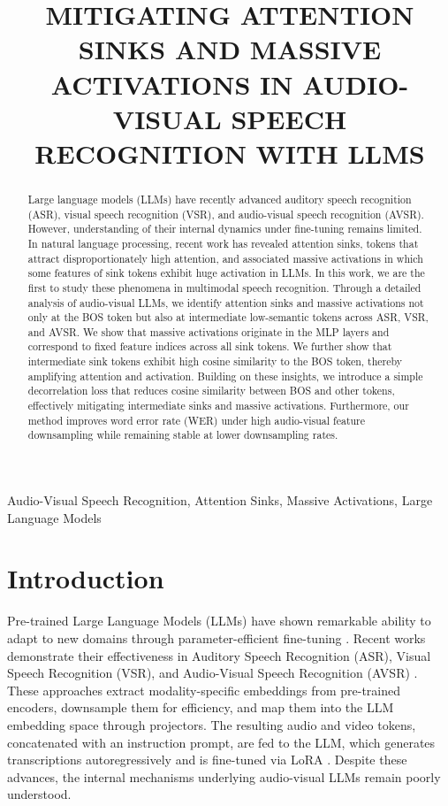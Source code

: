 \documentclass{article}
\title{MITIGATING ATTENTION SINKS AND MASSIVE ACTIVATIONS IN AUDIO-VISUAL SPEECH RECOGNITION WITH LLMS}
\begin{document}
\ninept
%
\maketitle
%
\begin{abstract}
Large language models (LLMs) have recently advanced auditory speech recognition (ASR), visual speech recognition (VSR), and audio-visual speech recognition (AVSR). However, understanding of their internal dynamics under fine-tuning remains limited. In natural language processing, recent work has revealed attention sinks, tokens that attract disproportionately high attention, and associated massive activations in which some features of sink tokens exhibit huge activation in LLMs. In this work, we are the first to study these phenomena in multimodal speech recognition. Through a detailed analysis of audio-visual LLMs, we identify attention sinks and massive activations not only at the BOS token but also at intermediate low-semantic tokens across ASR, VSR, and AVSR. We show that massive activations originate in the MLP layers and correspond to fixed feature indices across all sink tokens. We further show that intermediate sink tokens exhibit high cosine similarity to the BOS token, thereby amplifying attention and activation. Building on these insights, we introduce a simple decorrelation loss that reduces cosine similarity between BOS and other tokens, effectively mitigating intermediate sinks and massive activations. Furthermore, our method improves word error rate (WER) under high audio-visual feature downsampling while remaining stable at lower downsampling rates.
\end{abstract}
%
\begin{keywords} 
Audio-Visual Speech Recognition, Attention Sinks, Massive Activations, Large Language Models
\end{keywords}
%
\section{Introduction}
\label{sec:intro}
Pre-trained Large Language Models (LLMs) have shown remarkable ability to adapt to new domains through parameter-efficient fine-tuning \cite{li2023blip, gao2023llama, fathullah2024prompting, ma2024embarrassingly, maaz2023video, chen2024llast, zang2025contextual}. Recent works demonstrate their effectiveness in Auditory Speech Recognition (ASR), Visual Speech Recognition (VSR), and Audio-Visual Speech Recognition (AVSR) \cite{cappellazzo2025large, thomas2025vallr, yeo2024visual, cappellazzo2025adaptive, yeo2025mms, llama-SMoP, yeo2025zero, cappellazzo2025mome, cappellazzo2025omni}. These approaches extract modality-specific embeddings from pre-trained encoders, downsample them for efficiency, and map them into the LLM embedding space through projectors. The resulting audio and video tokens, concatenated with an instruction prompt, are fed to the LLM, which generates transcriptions autoregressively and is fine-tuned via LoRA \cite{hu2022lora}. Despite these advances, the internal mechanisms underlying audio-visual LLMs remain poorly understood.
\end{document}
